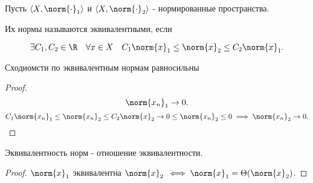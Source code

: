 
\begin{definition} \thmslashn 

    Пусть $\left<X, \norm{\cdot}_{1}\right>$ и $\left<X, \norm{\cdot }_{2}\right>$ - нормированные пространства.

Их нормы называются эквивалентными, если 

\[\exists{C_1, C_2\in \R}\quad \forall{x\in X}\quad C_1 \norm{x}_{1} \le \norm{x}_{2} \le C_2 \norm{x}_{1}.\]
\end{definition}
\begin{remark} \thmslashn

    Сходиомсти по эквивалентным нормам равносильны

    \begin{proof} \thmslashn
    
        \[ \norm{x_{n}}_{1} \to 0 .\]
        \[ C_1 \norm{x_{n}}_{1} \le \norm{x_{n}}_{2} \le C_2 \norm{x}_{2} \to  0 \le \norm{x_{n}}_{2} \le 0 \implies \norm{x_{n}}_{2} \to 0 .\] 
    \end{proof}
\end{remark}
\begin{remark} \thmslashn

    Эквивалентность норм - отношение эквивалентности.
    \begin{proof} \thmslashn
    
        $\norm{x}_{1}$ эквивалентна $\norm{x}_{2}$ $\iff \norm{x}_{1} = \Theta(\norm{x}_{2})$.
    \end{proof}
\end{remark}
